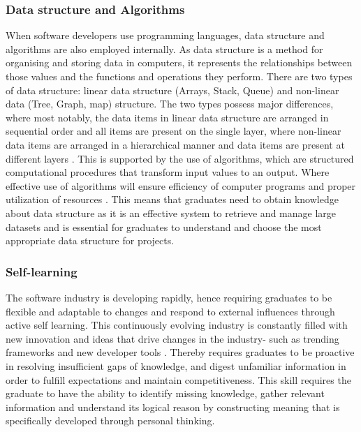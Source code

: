 \documentclass[a4paper, 11pt]{report}
\begin{document}
\subsubsection{Data structure and Algorithms}
When software developers use programming languages, data structure and algorithms are also employed internally. As data structure is a method for organising and storing data in computers, it represents the relationships between those values and the functions and operations they perform. There are two types of data structure: linear data structure (Arrays, Stack, Queue) and non-linear data (Tree, Graph, map) structure. The two types possess major differences, where most notably, the data items in linear data structure are arranged in sequential order and all items are present on the single layer, where non-linear data items are arranged in a hierarchical manner and data items are present at different layers \cite{Programiznd}. This is supported by the use of algorithms, which are structured computational procedures that transform input values to an output. Where effective use of algorithms will ensure efficiency of computer programs and proper utilization of resources \cite{Mulongo2022}. This means that graduates need to obtain knowledge about data structure as it is an effective system to retrieve and manage large datasets and is essential for graduates to understand and choose the most appropriate data structure for projects. 

\subsubsection{Self-learning}
The software industry is developing rapidly, hence requiring graduates to be flexible and adaptable to changes and respond to external influences through active self learning. This continuously evolving industry is constantly filled with new innovation and ideas that drive changes in the industry- such as trending frameworks and new developer tools . Thereby requires graduates to be proactive in resolving insufficient gaps of knowledge, and digest unfamiliar information in order to fulfill expectations and maintain competitiveness. This skill requires the graduate to have the ability to identify missing knowledge, gather relevant information and understand its logical reason by constructing meaning that is specifically developed through personal thinking.
\end{document}
